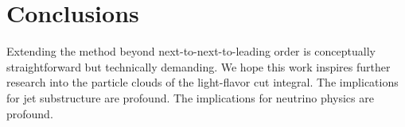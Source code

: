 \section{Conclusions}\label{sec:conclusions}

Extending the method beyond next-to-next-to-leading order is
conceptually straightforward but technically demanding. We hope this
work inspires further research into the particle clouds of the
light-flavor cut integral. The implications for jet substructure are
profound. The implications for neutrino physics are profound.

